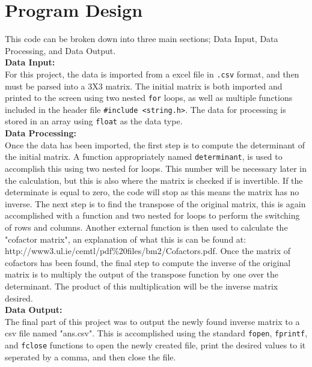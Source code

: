 \documentclass[11pt]{report}
\newcommand{\code}[1]{\colorbox{light-gray}{\texttt{#1}}}
\begin{document}
\section{Program Design}
\begin{outline}
\item This code can be broken down into three main sections; Data Input, Data Processing, and Data Output.
\\\textbf{Data Input:}\\
For this project, the data is imported from a excel file in \code{.csv} format, and then must be parsed into a 3X3 matrix. The initial matrix is both imported and printed to the screen using two nested \code{for} loops, as well as multiple functions included in the header file \code{#include <string.h>}. The data for processing is stored in an array using \code{float} as the data type. \\
\textbf{Data Processing:}\\
Once the data has been imported, the first step is to compute the determinant of the initial matrix. A function appropriately named \code{determinant}, is used to accomplish this using two nested for loops. This number will be necessary later in the calculation, but this is also where the matrix is checked if is invertible. If the determinate is equal to zero, the code will stop as this means the matrix has no inverse. The next step is to find the transpose of the original matrix, this is again accomplished with a function and two nested for loops to perform the switching of rows and columns. Another external function is then used to calculate the "cofactor matrix", an explanation of what this is can be found at: http://www3.ul.ie/cemtl/pdf\%20files/bm2/Cofactors.pdf. Once the matrix of cofactors has been found, the final step to compute the inverse of the original matrix is to multiply the output of the transpose function by one over the determinant. The product of this multiplication will be the inverse matrix desired.\\
\textbf{Data Output:}\\
The final part of this project was to output the newly found inverse matrix to a csv file named "ans.csv". This is accomplished using the standard \code{fopen}, \code{fprintf}, and \code{fclose} functions to open the newly created file, print the desired values to it seperated by a comma, and then close the file.
\end{outline}
\end{document}
